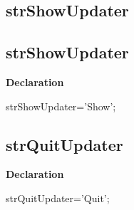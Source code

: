 \documentclass{report}
\newif\ifpdf
\begin{document}
\subsection*{\large{\textbf{strShowUpdater}}\normalsize\hspace{1ex}\hrulefill}
\else
\subsection*{strShowUpdater}
\fi
\label{trstrings-strShowUpdater}
\begin{list}{}{
\setlength{\itemindent}{0cm}
\setlength{\listparindent}{0cm}
\setlength{\leftmargin}{\evensidemargin}
\addtolength{\leftmargin}{\tmplength}
\settowidth{\labelsep}{X}
\addtolength{\leftmargin}{\labelsep}
\setlength{\labelwidth}{\tmplength}
}
\item[\textbf{Declaration}\hfill]
\ifpdf
\begin{flushleft}
\fi
\begin{ttfamily}
strShowUpdater='Show';\end{ttfamily}

\ifpdf
\end{flushleft}
\fi

\end{list}
\ifpdf
\subsection*{\large{\textbf{strQuitUpdater}}\normalsize\hspace{1ex}\hrulefill}
\else
\subsection*{strQuitUpdater}
\fi
\label{trstrings-strQuitUpdater}
\begin{list}{}{
\setlength{\itemindent}{0cm}
\setlength{\listparindent}{0cm}
\setlength{\leftmargin}{\evensidemargin}
\addtolength{\leftmargin}{\tmplength}
\settowidth{\labelsep}{X}
\addtolength{\leftmargin}{\labelsep}
\setlength{\labelwidth}{\tmplength}
}
\item[\textbf{Declaration}\hfill]
\ifpdf
\begin{flushleft}
\fi
\begin{ttfamily}
strQuitUpdater='Quit';\end{ttfamily}

\ifpdf
\end{flushleft}
\fi

\end{list}
\ifpdf
\end{document}

